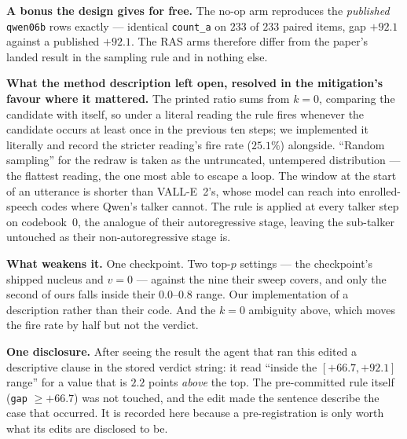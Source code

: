 \documentclass[11pt]{article}
\begin{document}
\textbf{A bonus the design gives for free.} The no-op arm reproduces the
\emph{published} \texttt{qwen06b} rows exactly --- identical \texttt{count\_a} on
$233$ of $233$ paired items, gap $+92.1$ against a published $+92.1$. The RAS
arms therefore differ from the paper's landed result in the sampling rule and in
nothing else.

\textbf{What the method description left open, resolved in the mitigation's
favour where it mattered.} The printed ratio sums from $k{=}0$, comparing the
candidate with itself, so under a literal reading the rule fires whenever the
candidate occurs at least once in the previous ten steps; we implemented it
literally and record the stricter reading's fire rate ($25.1\%$) alongside.
``Random sampling'' for the redraw is taken as the untruncated, untempered
distribution --- the flattest reading, the one most able to escape a loop. The
window at the start of an utterance is shorter than VALL-E~2's, whose model can
reach into enrolled-speech codes where Qwen's talker cannot. The rule is applied
at every talker step on codebook~0, the analogue of their autoregressive stage,
leaving the sub-talker untouched as their non-autoregressive stage is.

\textbf{What weakens it.} One checkpoint. Two $\text{top-}p$ settings --- the
checkpoint's shipped nucleus and $v{=}0$ --- against the nine their sweep covers,
and only the second of ours falls inside their $0.0$--$0.8$ range. Our implementation of a description rather than their code.
And the $k{=}0$ ambiguity above, which moves the fire rate by half but not the
verdict.

\textbf{One disclosure.} After seeing the result the agent that ran this edited a
descriptive clause in the stored verdict string: it read ``inside the
$[+66.7, +92.1]$ range'' for a value that is $2.2$ points \emph{above} the top.
The pre-committed rule itself (\texttt{gap} $\ge +66.7$) was not touched, and the
edit made the sentence describe the case that occurred. It is recorded here
because a pre-registration is only worth what its edits are disclosed to be.



\end{document}
